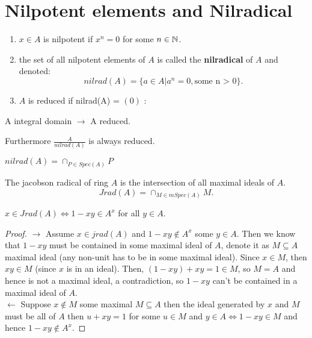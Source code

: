 \documentclass[a4paper]{article}
\begin{document}
\section{Nilpotent elements and Nilradical}
\begin{definition}
  \begin{enumerate}
    \item $x \in A$ is nilpotent if  $x^n = 0$ for some  $n \in \mathbb{N}$. 
    \item the set of all nilpotent elements of $A$ is called the \textbf{nilradical} of $A$ and
      denoted:
      \[
        nilrad(A) = \{a \in A | a^n = 0, \text{some n > 0}\} 
      .\]
    \item $A$ is reduced if  nilrad(A) = $\left( 0 \right) $ : 
  \end{enumerate}
\end{definition}

\begin{prop}
  A integral domain $\to$ A reduced. 
\end{prop}
\begin{prop}
  Furthermore $\frac{A}{nilrad(A)}$ is always reduced.
\end{prop}
\begin{prop}
  $nilrad(A) = \cap_{P \in Spec(A)} P$ 
\end{prop}

\begin{definition}
  The jacobson radical of ring $A$ is the intersection of all maximal ideals of $A$.
   \[
  Jrad(A) = \cap_{M \in mSpec(A)} M 
  .\] 
\end{definition}

\begin{prop}
  $x \in Jrad(A) \iff 1 - xy \in A^x$ for all $y \in A$.

  \begin{proof}
    $\to$ Assume  $x \in jrad(A)$ and  $1-xy \not\in A^{x}$ some $y \in A$. Then we know that $1-xy$ must  
    be contained in some maximal ideal of $A$, denote it as $M \subseteq A$ maximal ideal (any non-unit has to be in some maximal ideal). Since  $x \in M$,
    then $xy \in M$ (since  $x$  is in an ideal). Then, $(1-xy) + xy = 1 \in M$, so  $M = A$ and hence is not 
    a maximal ideal, a contradiction, so $1-xy$ can't be contained in a maximal ideal of  $A$. \\
    
    $\leftarrow$ Suppose  $x \not\in M$ some maximal  $M \subseteq A$ then the ideal generated by  $x$ and
     $M$ must be all of  $A$ then $u + xy = 1$ for some  $u \in M$ and  $y \in A \iff 1-xy \in M$ and hence
     $1 - xy \not\in A^x$.
  \end{proof}
\end{prop}
\end{document}
